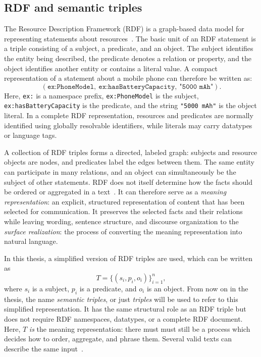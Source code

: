 \subsection{RDF and semantic triples}
\label{sec:rdf-semantic-triples}

The Resource Description Framework (RDF) is a graph-based data model for
representing statements about resources~\cite{w3c2014rdf11concepts}. The basic
unit of an RDF statement is a triple consisting of a subject, a predicate, and
an object. The subject identifies the entity being described, the predicate
denotes a relation or property, and the object identifies another entity or
contains a literal value. A compact representation of a statement about a
mobile phone can therefore be written as:
\begin{equation}
    (\texttt{ex:PhoneModel},\ \texttt{ex:hasBatteryCapacity},\ \texttt{"5000 mAh"}).
\end{equation}
Here, \texttt{ex:} is a namespace prefix, \texttt{ex:PhoneModel} is the
subject, \texttt{ex:hasBatteryCapacity} is the predicate, and the string
\texttt{"5000 mAh"} is the object literal. In a complete RDF representation,
resources and predicates are normally identified using globally resolvable
identifiers, while literals may carry datatypes or language tags.

A collection of RDF triples forms a directed, labeled graph: subjects and
resource objects are nodes, and predicates label the edges between them. The
same entity can participate in many relations, and an object can simultaneously
be the subject of other statements. RDF does not itself determine how the facts
should be ordered or aggregated in a text~\cite{w3c2014rdf11concepts}. It can
therefore serve as a \emph{meaning representation}: an explicit,
structured representation of content that has been selected for communication.
It preserves the selected facts
and their relations while leaving wording, sentence structure, and discourse
organization to the \emph{surface realization}: the process of converting the
meaning representation into natural language.

In this thesis, a simplified version of RDF triples are used, which can be written as
\begin{equation}
    T = \{(s_i,p_i,o_i)\}_{i=1}^{n},
\end{equation}
where $s_i$ is a subject, $p_i$ is a predicate, and $o_i$ is an object. From now on in the thesis, the name
\emph{semantic triples}, or just \emph{triples} will be used to refer to this simplified representation. 
It has the same structural role as an RDF triple but
does not require RDF namespaces, datatypes, or a complete RDF document. Here,
$T$ \emph{is} the meaning representation: there must must still be a process which decides how to order, aggregate, and phrase them. Several
valid texts can describe the same input~\cite{gatt2018survey,osuji2024systematic}.

